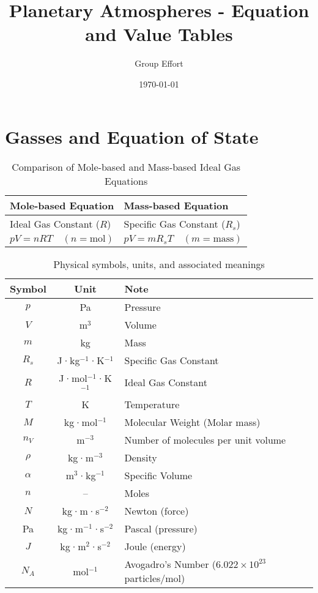 \documentclass[12pt, a4paper]{article} %
\begin{document}
\title{Planetary Atmospheres - Equation and Value Tables}
\author{Group Effort}
\date{\today}

\maketitle

\section{Gasses and Equation of State}

\begin{table}[H]
\centering
\renewcommand{\arraystretch}{1.3}
\begin{tabular}{|l|l|}
\hline
\textbf{Mole-based Equation} & \textbf{Mass-based Equation} \\
\hline
Ideal Gas Constant ($R$) & Specific Gas Constant ($R_s$) \\
$pV = nRT \quad (n = \text{mol})$ & $pV = mR_sT \quad (m = \text{mass})$ \\
\hline
\end{tabular}
\caption{Comparison of Mole-based and Mass-based Ideal Gas Equations}
\end{table}

\begin{table}[H]
\centering
\renewcommand{\arraystretch}{1.3}
\begin{tabular}{|c|c|l|}
\hline
\textbf{Symbol} & \textbf{Unit} & \textbf{Note} \\
\hline
$p$ & Pa & Pressure \\
$V$ & m$^3$ & Volume \\
$m$ & kg & Mass \\
$R_s$ & J·kg$^{-1}$·K$^{-1}$ & Specific Gas Constant \\
$R$ & J·mol$^{-1}$·K$^{-1}$ & Ideal Gas Constant \\
$T$ & K & Temperature \\
$M$ & kg·mol$^{-1}$ & Molecular Weight (Molar mass) \\
$n_V$ & m$^{-3}$ & Number of molecules per unit volume \\
$\rho$ & kg·m$^{-3}$ & Density \\
$\alpha$ & m$^3$·kg$^{-1}$ & Specific Volume \\
$n$ & – & Moles \\
\hline
$N$ & kg·m·s$^{-2}$ & Newton (force) \\
Pa & kg·m$^{-1}$·s$^{-2}$ & Pascal (pressure) \\
$J$ & kg·m$^2$·s$^{-2}$ & Joule (energy) \\
$N_A$ & mol$^{-1}$ & Avogadro’s Number ($6.022 \times 10^{23}$ particles/mol) \\
\hline
\end{tabular}
\caption{Physical symbols, units, and associated meanings}
\end{table}
\end{document}
